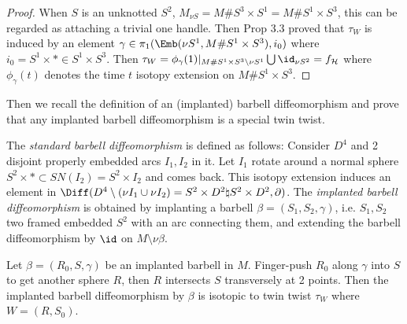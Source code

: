 \begin{proof}
    When $S$ is an unknotted $S^2$, $M_{\nu S}=M\# S^3\times S^1=M\# S^1\times S^3$, this can be regarded as attaching a trivial one handle. Then Prop 3.3 proved that $\tau_W$ is induced by an element $\gamma\in \pi_1(\Emb(\nu S^1, M\# S^1\times S^3), i_0)$ where $i_0=S^1\times *\in S^1\times S^3$. Then $\tau_W=\phi_\gamma(1)|_{M\# S^1\times S^3\setminus \nu S^1}\bigcup \id_{\nu S^2}=f_\mathcal{H}$ where $\phi_\gamma (t)$ denotes the time $t$ isotopy extension on $M\# S^1\times S^3$.
\end{proof}

Then we recall the definition of an (implanted) barbell diffeomorphism and prove that any implanted barbell diffeomorphism is a special twin twist.

\begin{definition}
    The \emph{standard barbell diffeomorphism} is defined as follows: Consider $D^4$ and 2 disjoint properly embedded arcs $I_1, I_2$ in it. Let $I_1$ rotate around a normal sphere $S^2\times *\subset SN(I_2)=S^2\times I_2$ and comes back. This isotopy extension induces an element in $\Diff(D^4\setminus (\nu I_1\cup \nu I_2)=S^2\times D^2 \natural S^2\times D^2, \partial)$. The \emph{implanted barbell diffeomorphism} is obtained by implanting a barbell $\beta=(S_1, S_2, \gamma)$, i.e. $S_1,S_2$ two framed embedded $S^2$ with an arc connecting them, and extending the barbell diffeomorphism by $\id$ on $M\setminus \nu \beta$.
\end{definition}

\begin{proposition}
    Let $\beta=(R_0,S,\gamma)$ be an implanted barbell in $M$. Finger-push $R_0$ along $\gamma$ into $S$ to get another sphere $R$, then $R$ intersects $S$ transversely at 2 points. Then the implanted barbell diffeomorphism by $\beta$ is isotopic to twin twist $\tau_W$ where $W=(R,S_0)$.
\end{proposition}

